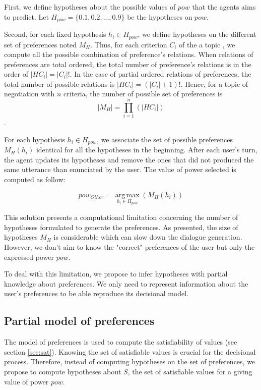 \documentclass[sigconf]{aamas}  %
\begin{document}
	First, we define hypotheses about the possible values of $pow$ that the agents aims to predict. Let $H_{pow} = \{0.1, 0.2, \ldots, 0.9\}$ be the hypotheses on $pow$.
	
	Second, for each fixed hypothesis $ h_i \in H_{pow}$, we define hypotheses on the different set of preferences  noted $M_H $. Thus, for each criterion $C_i$ of the a topic , we compute all the possible combination of preference's relations. When relations of preferences are total ordered, the total number of preference's relations is in the order of $|H{C_i}| = |C_i|!$. In the case of partial ordered relations of preferences, the total number of possible relations is  $ |H{C_i}| = (|C_i| + 1)!$. Hence, for a topic of negotiation with $n$ criteria, the number of possible set of preferences is 
	$$ |M_H| = \prod_{i=1}^n (|H{C_i}|)$$ .
	
	For each hypothesis $ h_i \in H_{pow}$, we associate the set of possible preferences $M_H(h_i)$ identical for all the hypotheses in the beginning. After each user's turn, the agent updates its hypotheses and remove the ones that did not produced the same utterance than enunciated by the user. The value of power selected is computed as follow:
	
	\begin{equation}
	pow_{Other} = \operatorname*{arg\,max}_{h_i \in H_{pow}} (M_H(h_i))
	\end{equation} 
	
	This solution presents a computational limitation concerning the number of hypotheses formulated to generate the preferences. As presented, the size of hypotheses $M_H$ is considerable which can slow down the dialogue generation. However, we don't aim to know the "correct" preferences of the user but only the expressed power $pow$. 
	
	To deal with this limitation, we propose to infer hypotheses with partial knowledge about preferences. We only need to represent information about the user's preferences to be able reproduce its decisional model. 
	
	
	
	\subsection{Partial model of preferences}
	
	The model of preferences is used to compute the satisfiability of values (see section \ref{sec:sat}). Knowing the set of satisfiable values is crucial for the decisional process. Therefore, instead of computing hypotheses on the set of preferences, we propose to compute hypotheses about $S$, the set of satisfiable values for a giving value of power $pow$.  
	
\end{document}
